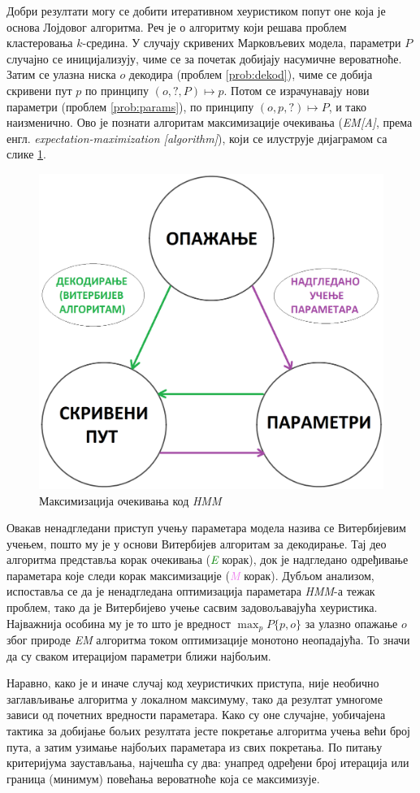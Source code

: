 \documentclass[12pt,oneside]{memoir}
\begin{document}
\begin{CJK}{UTF8}{ipxm}
Добри резултати могу се добити итеративном хеуристиком попут оне која је основа Лојдовог алгоритма. Реч је о алгоритму који решава проблем кластеровања $k$-средина. У случају скривених Марковљевих модела, параметри $P$ случајно се иницијализују, чиме се за почетак добијају насумичне вероватноће. Затим се улазна ниска $o$ декодира (проблем \ref{prob:dekod}), чиме се добија скривени пут $p$ по принципу $(o, ?, P) \mapsto p$. Потом се израчунавају нови параметри (проблем \ref{prob:params}), по принципу $(o, p, ?) \mapsto P$, и тако наизменично. Ово је познати алгоритам максимизације очекивања (\textit{EM[A]}, према енгл. \textit{expectation-maximization [algorithm]}), који се илуструје дијаграмом са слике \ref{fig:ema}.

\begin{figure}[H]
  \centering
  \includegraphics[width=.65\textwidth]{ema.png}
  \caption{Максимизација очекивања код \textit{HMM}}
  \label{fig:ema}
\end{figure}

Овакав ненадгледани приступ учењу параметара модела назива се Витербијевим учењем, пошто му је у основи Витербијев алгоритам за декодирање. Тај део алгоритма представља корак очекивања (\textit{\textcolor{green}{E}} корак), док је надгледано одређивање параметара које следи корак максимизације (\textit{\textcolor{violet}{M}} корак). Дубљом анализом, испоставља се да је ненадгледана оптимизација параметара \textit{HMM}-а тежак проблем, тако да је Витербијево учење сасвим задовољавајућа хеуристика. Најважнија особина му је то што је вредност $\max_p P\{p, o\}$ за улазно опажање $o$ због природе \textit{EM} алгоритма током оптимизације монотоно неопадајућа. То значи да су сваком итерацијом параметри ближи најбољим.

Наравно, како је и иначе случај код хеуристичких приступа, није необично заглављивање алгоритма у локалном максимуму, тако да резултат умногоме зависи од почетних вредности параметара. Како су оне случајне, уобичајена тактика за добијање бољих резултата јесте покретање алгоритма учења већи број пута, а затим узимање најбољих параметара из свих покретања. По питању критеријума заустављања, најчешћа су два: унапред одређени број итерација или граница (минимум) повећања вероватноће која се максимизује.


\end{CJK}
\end{document}

